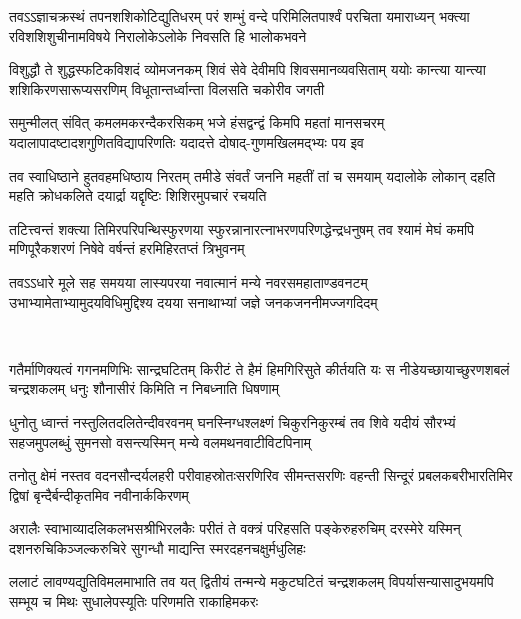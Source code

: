 \fourlineindentedshloka
{तवऽऽज्ञाचक्रस्थं तपनशशिकोटिद्युतिधरम्}
{परं शम्भुं वन्दे परिमिलितपार्श्वं परचिता}
{यमाराध्यन् भक्त्या रविशशिशुचीनामविषये}
{निरालोकेऽलोके निवसति हि भालोकभवने}%

\fourlineindentedshloka
{विशुद्धौ ते शुद्धस्फटिकविशदं व्योमजनकम्}
{शिवं सेवे देवीमपि शिवसमानव्यवसिताम्}
{ययोः कान्त्या यान्त्या शशिकिरणसारूप्यसरणिम्}
{विधूतान्तर्ध्वान्ता विलसति चकोरीव जगती}%

\fourlineindentedshloka
{समुन्मीलत् संवित् कमलमकरन्दैकरसिकम्}
{भजे हंसद्वन्द्वं किमपि महतां मानसचरम्}
{यदालापादष्टादशगुणितविद्यापरिणतिः}
{यदादत्ते दोषाद्-गुणमखिलमद्भ्यः पय इव}%

\fourlineindentedshloka
{तव स्वाधिष्ठाने हुतवहमधिष्ठाय निरतम्}
{तमीडे संवर्तं जननि महतीं तां च समयाम्}
{यदालोके लोकान् दहति महति क्रोधकलिते}
{दयार्द्रा यद्दृष्टिः शिशिरमुपचारं रचयति}%

\fourlineindentedshloka
{तटित्त्वन्तं शक्त्या तिमिरपरिपन्थिस्फुरणया}
{स्फुरन्नानारत्नाभरणपरिणद्धेन्द्रधनुषम्}
{तव श्यामं मेघं कमपि मणिपूरैकशरणं}
{निषेवे वर्षन्तं हरमिहिरतप्तं त्रिभुवनम्}%

\fourlineindentedshloka
{तवऽऽधारे मूले सह समयया लास्यपरया}
{नवात्मानं मन्ये नवरसमहाताण्डवनटम्}
{उभाभ्यामेताभ्यामुदयविधिमुद्दिश्य दयया}
{सनाथाभ्यां जज्ञे जनकजननीमज्जगदिदम्}%

\mbox{}\\

\fourlineindentedshloka
{गतैर्माणिक्यत्वं गगनमणिभिः सान्द्रघटितम्}
{किरीटं ते हैमं हिमगिरिसुते कीर्तयति यः}
{स नीडेयच्छायाच्छुरणशबलं चन्द्रशकलम्}
{धनुः शौनासीरं किमिति न निबध्नाति धिषणाम्}%

\fourlineindentedshloka
{धुनोतु ध्वान्तं नस्तुलितदलितेन्दीवरवनम्}
{घनस्निग्धश्लक्ष्णं चिकुरनिकुरम्बं तव शिवे}
{यदीयं सौरभ्यं सहजमुपलब्धुं सुमनसो}
{वसन्त्यस्मिन् मन्ये वलमथनवाटीविटपिनाम्}%

\fourlineindentedshloka
{तनोतु क्षेमं नस्तव वदनसौन्दर्यलहरी}
{परीवाहस्रोतःसरणिरिव सीमन्तसरणिः}
{वहन्ती सिन्दूरं प्रबलकबरीभारतिमिर}
{द्विषां बृन्दैर्बन्दीकृतमिव नवीनार्ककिरणम्}%

\fourlineindentedshloka
{अरालैः स्वाभाव्यादलिकलभसश्रीभिरलकैः}
{परीतं ते वक्त्रं परिहसति पङ्केरुहरुचिम्}
{दरस्मेरे यस्मिन् दशनरुचिकिञ्जल्करुचिरे}
{सुगन्धौ माद्यन्ति स्मरदहनचक्षुर्मधुलिहः}%

\fourlineindentedshloka
{ललाटं लावण्यद्युतिविमलमाभाति तव यत्}
{द्वितीयं तन्मन्ये मकुटघटितं चन्द्रशकलम्}
{विपर्यासन्यासादुभयमपि सम्भूय च मिथः}
{सुधालेपस्यूतिः परिणमति राकाहिमकरः}%

